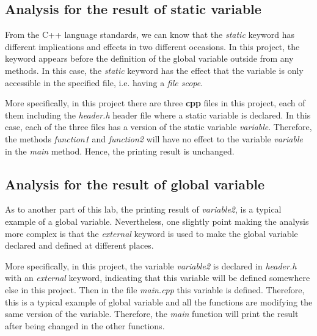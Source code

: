 \documentclass[a4paper]{report}
\begin{document}
\subsection{Analysis for the result of static variable}
From the C++ language standards, we can know that the \emph{static} keyword has different implications and effects in two different occasions. In this project, the keyword appears before the definition of the global variable outside from any methods. In this case, the \emph{static} keyword has the effect that the variable is only accessible in the specified file, i.e. having a \emph{file scope}.
\par
More specifically, in this project there are three \textbf{cpp} files in this project, each of them including the \emph{header.h} header file where a static variable is declared. In this case, each of the three files has a version of the static variable \emph{variable}. Therefore, the methods \emph{function1} and \emph{function2} will have no effect to the variable \emph{variable} in the \emph{main} method. Hence, the printing result is unchanged.

\subsection{Analysis for the result of global variable}
As to another part of this lab, the printing result of \emph{variable2}, is a typical example of a global variable. Nevertheless, one slightly point making the analysis more complex is that the \emph{external} keyword is used to make the global variable declared and defined at different places. 
\par
More specifically, in this project, the variable \emph{variable2} is declared in \emph{header.h} with an \emph{external} keyword, indicating that this variable will be defined somewhere else in this project. Then in the file \emph{main.cpp} this variable is defined. Therefore, this is a typical example of global variable and all the functions are modifying the same version of the variable. Therefore, the \emph{main} function will print the result after being changed in the other functions.
\end{document}

